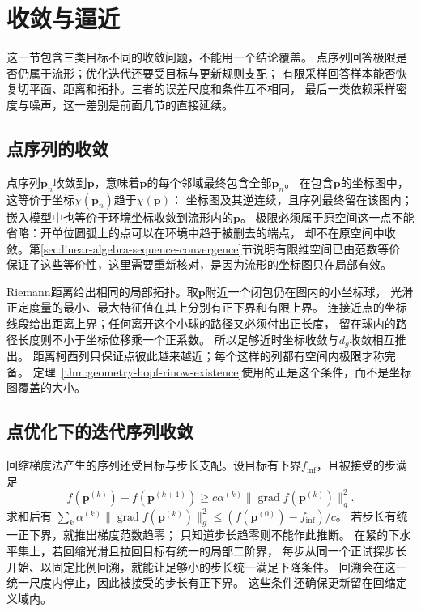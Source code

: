 \section{收敛与逼近}
\label{sec:geometry-convergence-approximation}

这一节包含三类目标不同的收敛问题，不能用一个结论覆盖。
点序列回答极限是否仍属于流形；优化迭代还要受目标与更新规则支配；
有限采样回答样本能否恢复切平面、距离和拓扑。三者的误差尺度和条件互不相同，
最后一类依赖采样密度与噪声，这一差别是前面几节的直接延续。

\subsection{点序列的收敛}
\label{sec:geometry-point-convergence}

点序列$\bm p_n$收敛到$\bm p$，意味着$\bm p$的每个邻域最终包含全部$\bm p_n$。
在包含$\bm p$的坐标图中，这等价于坐标$\chi(\bm p_n)$趋于$\chi(\bm p)$：
坐标图及其逆连续，且序列最终留在该图内；嵌入模型中也等价于环境坐标收敛到流形内的$\bm p$。
极限必须属于原空间这一点不能省略：开单位圆弧上的点可以在环境中趋于被删去的端点，
却不在原空间中收敛。第\ref{sec:linear-algebra-sequence-convergence}节说明有限维空间已由范数等价
保证了这些等价性，这里需要重新核对，是因为流形的坐标图只在局部有效。

Riemann距离给出相同的局部拓扑。取$\bm p$附近一个闭包仍在图内的小坐标球，
光滑正定度量的最小、最大特征值在其上分别有正下界和有限上界。
连接近点的坐标线段给出距离上界；任何离开这个小球的路径又必须付出正长度，
留在球内的路径长度则不小于坐标位移乘一个正系数。
所以足够近时坐标收敛与$d_g$收敛相互推出。
距离柯西列只保证点彼此越来越近；每个这样的列都有空间内极限才称完备。
定理~\ref{thm:geometry-hopf-rinow-existence}使用的正是这个条件，而不是坐标图覆盖的大小。

\subsection{点优化下的迭代序列收敛}
\label{sec:geometry-point-iteration-convergence}

回缩梯度法产生的序列还受目标与步长支配。设目标有下界$f_{\inf}$，且被接受的步满足
\[
 f(\bm p^{(k)})-f(\bm p^{(k+1)})\geq
 c\alpha^{(k)}\lVert\operatorname{grad}f(\bm p^{(k)})\rVert_g^2.
\]
求和后有
$\sum_k\alpha^{(k)}\lVert\operatorname{grad}f(\bm p^{(k)})\rVert_g^2
\leq(f(\bm p^{(0)})-f_{\inf})/c$。
若步长有统一正下界，就推出梯度范数趋零；
只知道步长趋零则不能作此推断。
在紧的下水平集上，若回缩光滑且拉回目标有统一的局部二阶界，
每步从同一个正试探步长开始、以固定比例回溯，就能让足够小的步长统一满足下降条件。
回溯会在这一统一尺度内停止，因此被接受的步长有正下界。
这些条件还确保更新留在回缩定义域内。


